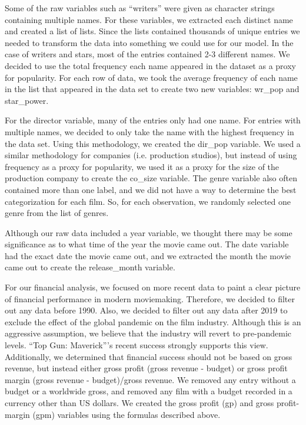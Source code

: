 \documentclass[10pt]{article}
\begin{document}
Some of the raw variables such as “writers” were given as character strings containing multiple names. For these variables, we extracted each distinct name and created a list of lists. Since the lists contained thousands of unique entries we needed to transform the data into something we could use for our model. In the case of writers and stars, most of the entries contained 2-3 different names. We decided to use the total frequency each name appeared in the dataset as a proxy for popularity. For each row of data, we took the average frequency of each name in the list that appeared in the data set to create two new variables: wr\_pop and star\_power.

For the director variable, many of the entries only had one name. For entries with multiple names, we decided to only take the name with the highest frequency in the data set. Using this methodology, we created the dir\_pop variable. We used a similar methodology for companies (i.e. production studios), but instead of using frequency as a proxy for popularity, we used it as a proxy for the size of the production company to create the co\_size variable. The genre variable also often contained more than one label, and we did not have a way to determine the best categorization for each film. So, for each observation, we randomly selected one genre from the list of genres.

Although our raw data included a year variable, we thought there may be some significance as to what time of the year the movie came out. The date variable had the exact date the movie came out, and we extracted the month the movie came out to create the release\_month variable.

For our financial analysis, we focused on more recent data to paint a clear picture of financial performance in modern moviemaking. Therefore, we decided to filter out any data before 1990. Also, we decided to filter out any data after 2019 to exclude the effect of the global pandemic on the film industry. Although this is an aggressive assumption, we believe that the industry will revert to pre-pandemic levels. “Top Gun: Maverick”’s recent success strongly supports this view. Additionally, we determined that financial success should not be based on gross revenue, but instead either gross profit (gross revenue - budget) or gross profit margin (gross revenue - budget)/gross revenue. We removed any entry without a budget or a worldwide gross, and removed any film with a budget recorded in a currency other than US dollars. We created the gross profit (gp) and gross profit-margin (gpm) variables using the formulas described above. 
\end{document}
